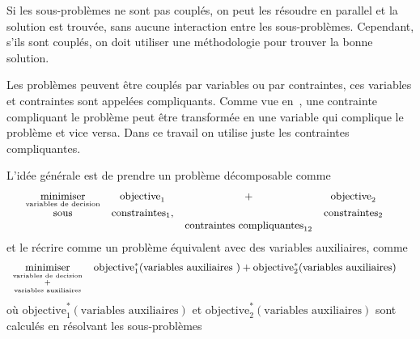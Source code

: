 \documentclass[../main.tex]{subfiles}
\begin{document}
Si les sous-problèmes ne sont pas couplés, on peut les résoudre en parallel et la solution est trouvée, sans aucune interaction entre les sous-problèmes.
Cependant, s'ils sont couplés, on doit utiliser une méthodologie pour trouver la bonne solution.

Les problèmes peuvent être couplés par variables ou par contraintes, ces variables et contraintes sont appelées compliquants.
Comme vue en~\cite{BoydEtAl2015}, une contrainte compliquant le problème peut être transformée en une variable qui complique le problème et vice versa.
Dans ce travail on utilise juste les contraintes compliquantes.

L'idée générale est de prendre un problème décomposable comme
\begin{equation}\label{eq:general_coupled_optimization_problem_fr}
  \small
  \begin{aligned}
    \begin{matrix}
      \mathop{\textrm{minimiser}}\limits_{\text{variables de decision}}  &\text{objective}_{1}&+&\text{objective}_{2}&\\
      \mathrm{sous} & \text{constraintes}_{1},&&  \text{constraintes}_{2}\\
      &&\text{contraintes compliquantes}_{12}&
    \end{matrix}
  \end{aligned}
\end{equation}
et le récrire comme un problème équivalent avec des variables auxiliaires, comme
\begin{equation}\label{eq:general_coupled_optimization_problem_decomposed_main_problem_fr}
  \small
  \begin{aligned}
    \begin{matrix}
      \mathop{\textrm{minimiser}}\limits_{\mathop{\operatorname{+}}\limits^{\text{variables de decision}}_{\text{variables auxiliaires}}}  &\text{objective}^{*}_{1}(\text{variables auxiliaires })+\text{objective}^{*}_{2}(\text{variables auxiliaires})&\\
    \end{matrix}
  \end{aligned}
\end{equation}
où $\text{objective}^{*}_{1}(\text{variables auxiliaires})$ et $\text{objective}^{*}_{2}(\text{variables auxiliaires})$ sont calculés en résolvant les sous-problèmes
\end{document}
